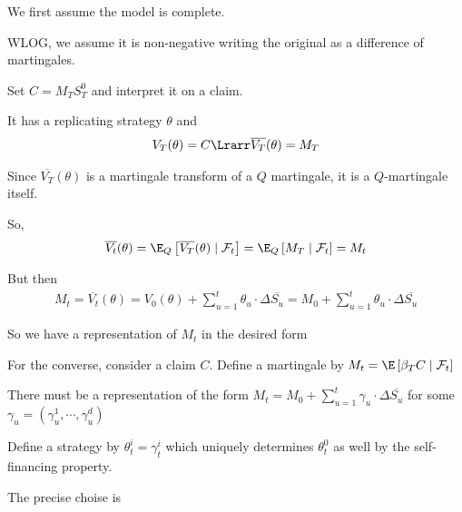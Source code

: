 \begin{prf}[]{}
  We first assume the model is complete.\par
  \noindent WLOG, we assume it is non-negative writing the original as a difference of martingales.\par
  \noindent Set $C = M_TS_T^0$ and interpret it on a claim.\par
  \noindent It has a replicating strategy $\theta$ and
  \begin{equation*}
    \begin{gathered}
      V_T(\theta) = C\Lrarr \overline{V_T}(\theta) = M_T
    \end{gathered}
  \end{equation*}
  \par\bigskip
  \noindent Since $\overline{V_T}(\theta)$ is a martingale transform of a $Q$ martingale, it is a $Q$-martingale itself.
  \par\bigskip
  \noindent So, 
  \begin{equation*}
    \begin{gathered}
      \overline{V_t}(\theta) =\E_Q\left[\overline{V_T}(\theta)\mid\mathcal{F}_t\right] = \E_Q\left[M_T\mid\mathcal{F}_t\right] = M_t
    \end{gathered}
  \end{equation*}\par
  \noindent But then
  \begin{equation*}
    \begin{gathered}
      M_t = \overline{V_t}(\theta) = V_0(\theta) + \sum_{u=1}^{t} \theta_u\cdot\Delta\overline{S_u} = M_0+\sum_{u=1}^{t}\theta_u\cdot\Delta\overline{S_u}
    \end{gathered}
  \end{equation*}\par
  \noindent So we have a representation of $M_t$ in the desired form
  \par\bigskip
  \noindent For the converse, consider a claim $C$. Define a martingale by $M_t = \E\left[\beta_T C\mid\mathcal{F}_t\right]$\par
  \noindent There must be a representation of the form $M_t = M_0+\sum_{u=1}^{t}\gamma_u\cdot\Delta\overline{S_u}$ for some $\gamma_u = (\gamma_u^1,\cdots,\gamma_u^d)$\par
  \noindent Define a strategy by $\theta_t^i = \gamma_t^i$ which uniquely determines $\theta_t^0$ as well by the self-financing property.\par
  \noindent The precise choise is
  \begin{equation*}

\end{equation*}
\end{prf}
